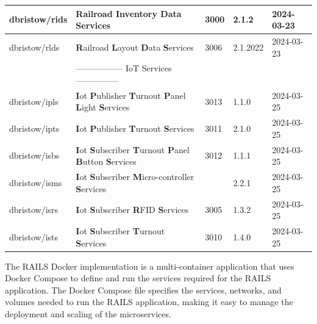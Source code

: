 \begin{longtable}{|L{3cm}|L{7cm}|L{1cm}|L{1.5cm}|L{2cm}|}
  dbristow/rids & \textbf{R}ailroad \textbf{I}nventory \textbf{D}ata \textbf{S}ervices  & 3000 & 2.1.2 & 2024-03-23 \\ \hline
  dbristow/rlds & \textbf{R}ailroad \textbf{L}ayout \textbf{D}ata \textbf{S}ervices  & 3006 & 2.1.2022 & 2024-03-23 \\ \hline
  & ----------------- IoT Services --------------- &  &  & \\ \hline
  dbristow/ipls & \textbf{I}ot \textbf{P}ublisher \textbf{T}urnout \textbf{P}anel \textbf{L}ight \textbf{S}ervices & 3013 & 1.1.0 & 2024-03-25 \\ \hline
  dbristow/ipts & \textbf{I}ot \textbf{P}ublisher \textbf{T}urnout \textbf{S}ervices & 3011 & 2.1.0 & 2024-03-25 \\ \hline
  dbristow/isbs & \textbf{I}ot \textbf{S}ubscriber \textbf{T}urnout \textbf{P}anel \textbf{B}utton \textbf{S}ervices & 3012 & 1.1.1 & 2024-03-25 \\ \hline
  dbristow/isms & \textbf{I}ot \textbf{S}ubscriber \textbf{M}icro-controller \textbf{S}ervices &  & 2.2.1 & 2024-03-25 \\ \hline
  dbristow/isrs & \textbf{I}ot \textbf{S}ubscriber \textbf{R}FID \textbf{S}ervices & 3005 & 1.3.2 & 2024-03-25 \\ \hline
  dbristow/ists & \textbf{I}ot \textbf{S}ubscriber \textbf{T}urnout \textbf{S}ervices & 3010 & 1.4.0 & 2024-03-25 \\ \hline
    \end{longtable}
The \ac{RAILS} Docker implementation is a multi-container application that uses Docker Compose to define and run the services required for the \ac{RAILS} application. The Docker Compose file specifies the services, networks, and volumes needed to run the \ac{RAILS} application, making it easy to manage the deployment and scaling of the microservices.
